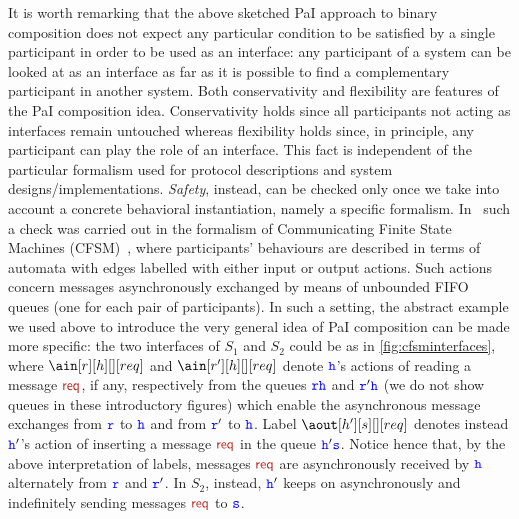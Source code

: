  It is worth remarking that the above sketched PaI approach to binary composition does not expect any particular condition to be satisfied by a single participant in order to be used as an interface:
 any participant of a system can be looked at as an interface as far as it is possible to find
a  complementary participant in another system. 
Both conservativity and flexibility are features of the PaI composition idea.
 Conservativity holds since all participants not acting as interfaces remain untouched whereas flexibility holds since, in principle, any participant can play the role of an interface. This fact is independent of the particular formalism used for protocol descriptions and system designs/implementations. 
{\em Safety}, instead, can be checked  only once we take into account a
concrete behavioral instantiation, namely a specific formalism.
In~\cite{BdLH19} such a check was carried out in the formalism of Communicating Finite State Machines  (CFSM)~\cite{BZ83},
where participants' behaviours are described in terms of automata with edges labelled with
either input or output actions. Such actions concern messages asynchronously exchanged 
by means of unbounded FIFO queues (one for each pair of participants).
In such a setting, the abstract example we used above to introduce the very general idea
of PaI composition can be made more specific: the two interfaces of $S_1$ and $S_2$ could be
as in \cref{fig:cfsminterfaces}, where $\ain[r][h][][req]$ and $\ain[r'][h][][req]$ denote ${\mathtt{\color{blue}{ {h}}}}$'s actions of reading a message $\msg[req]$, if any, respectively from the queues ${\mathtt{\color{blue}{ {r}}}}{\mathtt{\color{blue}{ {h}}}}$
and ${\mathtt{\color{blue}{ {r}}}}'{\mathtt{\color{blue}{ {h}}}}$ (we do not show queues in these introductory figures) which enable the asynchronous message exchanges from ${\mathtt{\color{blue}{ {r}}}}$ to ${\mathtt{\color{blue}{ {h}}}}$ and from ${\mathtt{\color{blue}{ {r}}}}'$ to ${\mathtt{\color{blue}{ {h}}}}$.
Label $\aout[h'][s][][req]$ 
denotes instead ${\mathtt{\color{blue}{ {h}}}}'$'s action of inserting a message $\msg[req]$ 
in the queue ${\mathtt{\color{blue}{ {h}}}}'{\mathtt{\color{blue}{ {s}}}}$.
Notice hence that, by the above interpretation of labels, messages $\msg[req]$
are asynchronously received by ${\mathtt{\color{blue}{ {h}}}}$ alternately from ${\mathtt{\color{blue}{ {r}}}}$ and ${\mathtt{\color{blue}{ {r}}}}'$.
In $S_2$, instead,  ${\mathtt{\color{blue}{ {h}}}}'$ keeps on asynchronously and indefinitely 
sending  messages $\msg[req]$ to ${\mathtt{\color{blue}{ {s}}}}$. 

